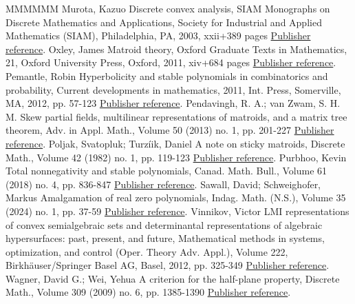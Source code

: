 \begin{thebibliography}{MMMMMM}
 Murota, Kazuo Discrete convex analysis, SIAM Monographs on Discrete Mathematics and Applications, Society for Industrial and Applied Mathematics (SIAM), Philadelphia, PA, 2003, xxii+389 pages \href{https://alco.centre-mersenne.org/articles/10.5802/alco.399/#murota}{Publisher reference}.
 Oxley, James Matroid theory, Oxford Graduate Texts in Mathematics, 21, Oxford University Press, Oxford, 2011, xiv+684 pages \href{https://alco.centre-mersenne.org/articles/10.5802/alco.399/#oxley}{Publisher reference}.
 Pemantle, Robin Hyperbolicity and stable polynomials in combinatorics and probability, Current developments in mathematics, 2011, Int. Press, Somerville, MA, 2012, pp. 57-123 \href{https://alco.centre-mersenne.org/articles/10.5802/alco.399/#pemantle}{Publisher reference}.
 Pendavingh, R. A.; van Zwam, S. H. M. Skew partial fields, multilinear representations of matroids, and a matrix tree theorem, Adv. in Appl. Math., Volume 50 (2013) no. 1, pp. 201-227 \href{https://alco.centre-mersenne.org/articles/10.5802/alco.399/#skewpartial}{Publisher reference}.
 Poljak, Svatopluk; Turzíik, Daniel A note on sticky matroids, Discrete Math., Volume 42 (1982) no. 1, pp. 119-123 \href{https://alco.centre-mersenne.org/articles/10.5802/alco.399/#sticky}{Publisher reference}.
 Purbhoo, Kevin Total nonnegativity and stable polynomials, Canad. Math. Bull., Volume 61 (2018) no. 4, pp. 836-847 \href{https://alco.centre-mersenne.org/articles/10.5802/alco.399/#purbhoo}{Publisher reference}.
 Sawall, David; Schweighofer, Markus Amalgamation of real zero polynomials, Indag. Math. (N.S.), Volume 35 (2024) no. 1, pp. 37-59 \href{https://alco.centre-mersenne.org/articles/10.5802/alco.399/#rzamalgamation}{Publisher reference}.
 Vinnikov, Victor LMI representations of convex semialgebraic sets and determinantal representations of algebraic hypersurfaces: past, present, and future, Mathematical methods in systems, optimization, and control (Oper. Theory Adv. Appl.), Volume 222, Birkhäuser/Springer Basel AG, Basel, 2012, pp. 325-349 \href{https://alco.centre-mersenne.org/articles/10.5802/alco.399/#victorsurvey}{Publisher reference}.
 Wagner, David G.; Wei, Yehua A criterion for the half-plane property, Discrete Math., Volume 309 (2009) no. 6, pp. 1385-1390 \href{https://alco.centre-mersenne.org/articles/10.5802/alco.399/#wagnerwei}{Publisher reference}.
\end{thebibliography}

